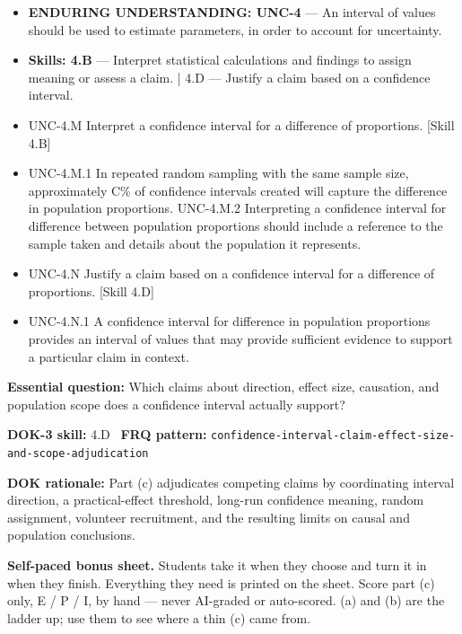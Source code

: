 \documentclass[11pt]{article}
\begin{document}


{\small
\begin{itemize}[leftmargin=1.5em,itemsep=2pt,topsep=2pt]
  \item \textbf{ENDURING UNDERSTANDING: UNC-4} --- An interval of values should be used to estimate parameters, in order to account for uncertainty.
  \item \textbf{Skills: 4.B} --- Interpret statistical calculations and findings to assign meaning or assess a claim. | 4.D --- Justify a claim based on a confidence interval.
  \item UNC-4.M Interpret a confidence interval for a difference of proportions. [Skill 4.B]
  \item UNC-4.M.1 In repeated random sampling with the same sample size, approximately C\% of confidence intervals created will capture the difference in population proportions. UNC-4.M.2 Interpreting a confidence interval for difference between population proportions should include a reference to the sample taken and details about the population it represents.
  \item UNC-4.N Justify a claim based on a confidence interval for a difference of proportions. [Skill 4.D]
  \item UNC-4.N.1 A confidence interval for difference in population proportions provides an interval of values that may provide sufficient evidence to support a particular claim in context.
\end{itemize}
}
\textbf{Essential question:} Which claims about direction, effect size, causation, and population scope does a confidence interval actually support?\par
\textbf{DOK-3 skill:} 4.D \textperiodcentered\ \textbf{FRQ pattern:} {\small\texttt{confidence-\allowbreak{}interval-\allowbreak{}claim-\allowbreak{}effect-\allowbreak{}size-\allowbreak{}and-\allowbreak{}scope-\allowbreak{}adjudication}}\par
\textbf{DOK rationale:} Part (c) adjudicates competing claims by coordinating interval direction, a practical-effect threshold, long-run confidence meaning, random assignment, volunteer recruitment, and the resulting limits on causal and population conclusions.\par

\textbf{Self-paced bonus sheet.} Students take it when they choose and turn it in when they finish. Everything they need is printed on the sheet. Score part (c) only, E / P / I, by hand --- never AI-graded or auto-scored. (a) and (b) are the ladder up; use them to see where a thin (c) came from.\par
\end{document}
